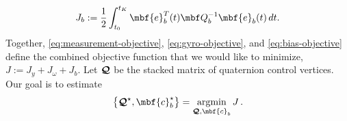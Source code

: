 \documentclass[11pt,a4paper,oneside]{article}
\begin{document}
\begin{equation}
  \label{eq:bias-objective}
  J_{b} := \frac{1}{2} \int_{t_{0}}^{t_{K}} \mbf{e}_{b}^{T}(t) \mbf Q_{b}^{-1} \mbf{e}_{b}(t)\,dt.
\end{equation}
Together, \eqref{eq:measurement-objective}, \eqref{eq:gyro-objective}, and \eqref{eq:bias-objective} define the combined objective function that we would like to minimize, $J := J_{y} + J_{\omega} + J_{b}$. Let ${{\boldsymbol{\mathcal{Q}}}}$ be the stacked matrix of quaternion control vertices. Our goal is to estimate
\begin{equation}
  \label{eq:e2-argmin}
  \left\{\mbc{Q}^{\star}, \mbf{c}_{b}^{\star}\right\} = \argmin_{\mbc{Q}, \mbf{c}_{b}} J\,.
\end{equation}



\end{document}
